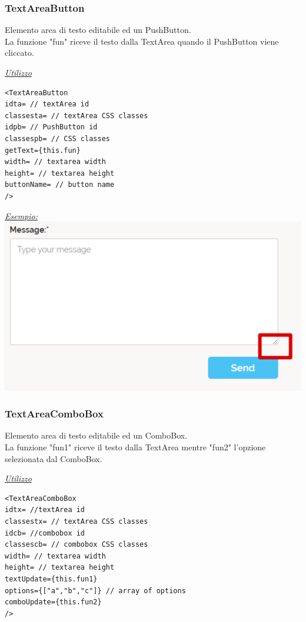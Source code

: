 \subsubsection{TextAreaButton}
Elemento area di testo editabile ed un PushButton.\\
La funzione "fun" riceve il testo dalla TextArea quando il PushButton viene cliccato.
\begin{center}
\underline{\textit{Utilizzo}}
\begin{lstlisting}
<TextAreaButton
idta= // textArea id
classesta= // textArea CSS classes
idpb= // PushButton id
classespb= // CSS classes
getText={this.fun}
width= // textarea width
height= // textarea height
buttonName= // button name
/>
\end{lstlisting}
\underline{\textit{Esempio:}}
\\
\includegraphics[scale=0.4]{img/textb.png}
\\
\end{center}

\subsubsection{TextAreaComboBox}
Elemento area di testo editabile ed un ComboBox.\\
La funzione "fun1" riceve il testo dalla TextArea mentre "fun2" l'opzione selezionata dal ComboBox.
\begin{center}
\underline{\textit{Utilizzo}}
\begin{lstlisting}
<TextAreaComboBox
idtx= //textArea id
classestx= // textArea CSS classes
idcb= //combobox id
classescb= // combobox CSS classes
width= // textarea width
height= // textarea height
textUpdate={this.fun1}
options={["a","b","c"]} // array of options
comboUpdate={this.fun2}
/>
\end{lstlisting}
\end{center}

